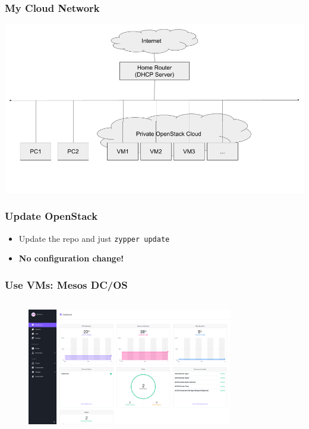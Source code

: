 \documentclass[aspectratio=169,11pt,hyperref={colorlinks=true}]{beamer}
\begin{document}
\begin{frame}
  \frametitle{My Cloud Network}
  \includegraphics[width=1.0\textwidth]{my_openstack_network.png}
\end{frame}

\begin{frame}
  \frametitle{Update OpenStack}
  \begin{itemize}
    \item Update the repo and just \texttt{zypper update}
    \item \bf{No configuration change!}
  \end{itemize}
\end{frame}

\begin{frame}
  \frametitle{Use VMs: Mesos DC/OS}
  \begin{columns}[T]
    \begin{column}{1.0\textwidth}
      \begin{figure}
        \includegraphics[width=0.8\textwidth]{mesos.png}
      \end{figure}
    \end{column}
  \end{columns}
\end{frame}
\end{document}
